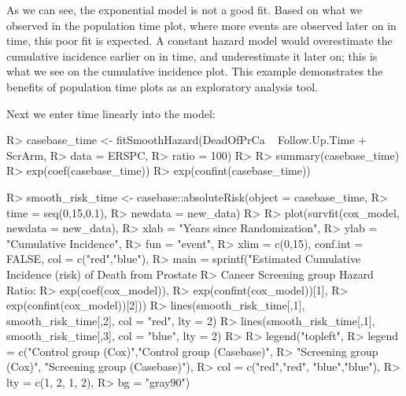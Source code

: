 \documentclass[
]{jss}
\begin{document}
As we can see, the exponential model is not a good fit. Based on what we
observed in the population time plot, where more events are observed
later on in time, this poor fit is expected. A constant hazard model
would overestimate the cumulative incidence earlier on in time, and
underestimate it later on; this is what we see on the cumulative
incidence plot. This example demonstrates the benefits of population
time plots as an exploratory analysis tool.

Next we enter time linearly into the model:

\begin{CodeChunk}

\begin{CodeInput}
R> casebase_time <- fitSmoothHazard(DeadOfPrCa ~ Follow.Up.Time + ScrArm, 
R>                                  data = ERSPC, 
R>                                  ratio = 100)
R> 
R> summary(casebase_time)
R> exp(coef(casebase_time))
R> exp(confint(casebase_time))
\end{CodeInput}
\end{CodeChunk}

\begin{CodeChunk}

\begin{CodeInput}
R> smooth_risk_time <- casebase::absoluteRisk(object = casebase_time, 
R>                                           time = seq(0,15,0.1), 
R>                                           newdata = new_data)
R> 
R> plot(survfit(cox_model, newdata = new_data),
R>      xlab = "Years since Randomization", 
R>      ylab = "Cumulative Incidence", 
R>      fun = "event",
R>      xlim = c(0,15), conf.int = FALSE, col = c("red","blue"), 
R>      main = sprintf("Estimated Cumulative Incidence (risk) of Death from Prostate 
R>                     Cancer Screening group Hazard Ratio: %
R>                     exp(coef(cox_model)), 
R>                     exp(confint(cox_model))[1], 
R>                     exp(confint(cox_model))[2]))
R> lines(smooth_risk_time[,1], smooth_risk_time[,2], col = "red", lty = 2)
R> lines(smooth_risk_time[,1], smooth_risk_time[,3], col = "blue", lty = 2)
R> 
R> legend("topleft", 
R>        legend = c("Control group (Cox)","Control group (Casebase)",
R>                   "Screening group (Cox)", "Screening group (Casebase)"), 
R>        col = c("red","red", "blue","blue"),
R>        lty = c(1, 2, 1, 2), 
R>        bg = "gray90")
\end{CodeInput}
\end{CodeChunk}
\end{document}
